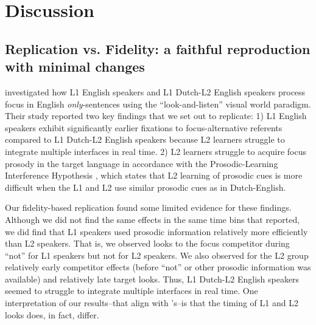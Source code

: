 
\section{Discussion}
\subsection{Replication vs. Fidelity: a faithful reproduction with minimal changes}

\textcite{ge2021a} investigated how L1 English speakers and L1 Dutch-L2 English speakers process focus in English \textit{only}-sentences using the “look-and-listen” visual world paradigm. Their study reported two key findings that we set out to replicate: 1) L1 English speakers exhibit significantly earlier fixations to focus-alternative referents compared to L1 Dutch-L2 English speakers because L2 learners struggle to integrate multiple interfaces in real time. 2) L2 learners struggle to acquire focus prosody in the target language in accordance with the Prosodic-Learning Interference Hypothesis \parencite{tremblay2016effects, tremblay2021re}, which states that L2 learning of prosodic cues is more difficult when the L1 and L2 use similar prosodic cues as in Dutch-English.

Our fidelity-based replication found some limited evidence for these findings. Although we did not find the same effects in the same time bins that \textcite{ge2021a} reported, we did find that L1 speakers used prosodic information relatively more efficiently than L2 speakers. That is, we observed looks to the focus competitor during “not” for L1 speakers but not for L2 speakers. We also observed for the L2 group relatively early competitor effects (before “not” or other prosodic information was available) and relatively late target looks. Thus, L1 Dutch-L2 English speakers seemed to struggle to integrate multiple interfaces in real time. One interpretation of our results--that align with \textcite{ge2021a}'s--is that the timing of L1 and L2 looks does, in fact, differ. 

